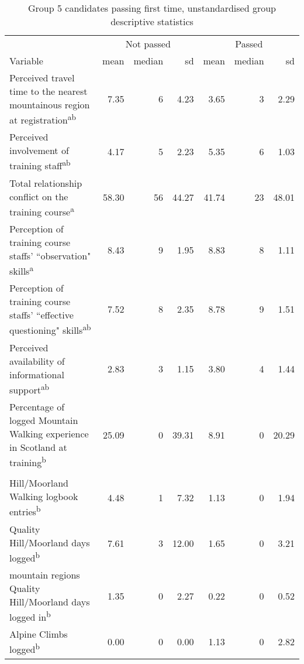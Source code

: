 \documentclass[
  12pt,
  a4paper,
]{book}
\begin{document}
\begin{landscape}\begin{table}

\caption{\label{tab:ftp-combined-summary-stats}Group 5 candidates passing first time, unstandardised group descriptive statistics}
\centering
\begin{tabular}[t]{>{\raggedright\arraybackslash}p{14cm}rrrrrr}
\toprule
\multicolumn{1}{c}{ } & \multicolumn{3}{c}{Not passed} & \multicolumn{3}{c}{Passed} \\
\cmidrule(l{3pt}r{3pt}){2-4} \cmidrule(l{3pt}r{3pt}){5-7}
Variable & mean & median & sd & mean & median & sd\\
\midrule
\rowcolor{gray!6}  Perceived travel time to the nearest mountainous region at registration\textsuperscript{ab} & 7.35 & 6 & 4.23 & 3.65 & 3 & 2.29\\
Perceived involvement of training staff\textsuperscript{ab} & 4.17 & 5 & 2.23 & 5.35 & 6 & 1.03\\
\rowcolor{gray!6}  Total relationship conflict on the training course\textsuperscript{a} & 58.30 & 56 & 44.27 & 41.74 & 23 & 48.01\\
Perception of training course staffs' ``observation" skills\textsuperscript{a} & 8.43 & 9 & 1.95 & 8.83 & 8 & 1.11\\
\rowcolor{gray!6}  Perception of training course staffs' ``effective questioning" skills\textsuperscript{ab} & 7.52 & 8 & 2.35 & 8.78 & 9 & 1.51\\
Perceived availability of informational support\textsuperscript{ab} & 2.83 & 3 & 1.15 & 3.80 & 4 & 1.44\\
\rowcolor{gray!6}  Percentage of logged Mountain Walking experience in Scotland at training\textsuperscript{b} & 25.09 & 0 & 39.31 & 8.91 & 0 & 20.29\\
\addlinespace[0.3em]
\multicolumn{7}{l}{\textbf{At assessment, number of...}}\\
\hspace{1em}Hill/Moorland Walking logbook entries\textsuperscript{b} & 4.48 & 1 & 7.32 & 1.13 & 0 & 1.94\\
\rowcolor{gray!6}  \hspace{1em}Quality Hill/Moorland days logged\textsuperscript{b} & 7.61 & 3 & 12.00 & 1.65 & 0 & 3.21\\
\hspace{1em}mountain regions Quality Hill/Moorland days logged in\textsuperscript{b} & 1.35 & 0 & 2.27 & 0.22 & 0 & 0.52\\
\rowcolor{gray!6}  \hspace{1em}Alpine Climbs logged\textsuperscript{b} & 0.00 & 0 & 0.00 & 1.13 & 0 & 2.82\\

\end{tabular}
\end{table}
\end{landscape}
\end{document}
